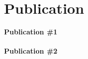\section{Publication}
{\footnotesize

\textbf{Publication \#1}\\
\lipsum[66]\\

\textbf{Publication \#2}\\
\lipsum[66]

}


